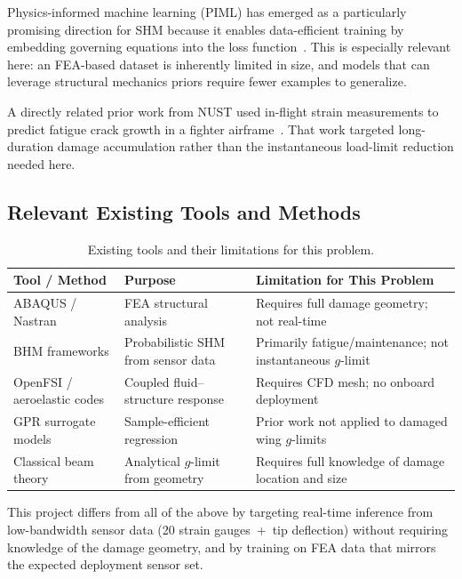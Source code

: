 \documentclass[10pt,letterpaper]{article}
\begin{document}
Physics-informed machine learning (PIML) has emerged as a particularly promising direction
for SHM because it enables data-efficient training by embedding governing equations into the
loss function~\cite{karniadakis2022}. This is especially relevant here: an FEA-based dataset
is inherently limited in size, and models that can leverage structural mechanics priors require
fewer examples to generalize.

A directly related prior work from NUST used in-flight strain measurements to predict fatigue
crack growth in a fighter airframe~\cite{azeem2025}. That work targeted long-duration damage
accumulation rather than the instantaneous load-limit reduction needed here.

\subsection{Relevant Existing Tools and Methods}

\begin{table}[H]
  \caption{Existing tools and their limitations for this problem.}
  \label{tab:tools}
  \centering\small
  \begin{tabularx}{\textwidth}{@{}lXX@{}}
    \toprule
    \textbf{Tool / Method} & \textbf{Purpose} & \textbf{Limitation for This Problem} \\
    \midrule
    ABAQUS / Nastran
      & FEA structural analysis
      & Requires full damage geometry; not real-time \\[3pt]
    BHM frameworks
      & Probabilistic SHM from sensor data
      & Primarily fatigue/maintenance; not instantaneous $g$-limit \\[3pt]
    OpenFSI / aeroelastic codes
      & Coupled fluid--structure response
      & Requires CFD mesh; no onboard deployment \\[3pt]
    GPR surrogate models
      & Sample-efficient regression
      & Prior work not applied to damaged wing $g$-limits \\[3pt]
    Classical beam theory
      & Analytical $g$-limit from geometry
      & Requires full knowledge of damage location and size \\
    \bottomrule
  \end{tabularx}
\end{table}

This project differs from all of the above by targeting real-time inference from
low-bandwidth sensor data (20 strain gauges~+~tip deflection) without requiring knowledge
of the damage geometry, and by training on FEA data that mirrors the expected deployment
sensor set.
\end{document}
